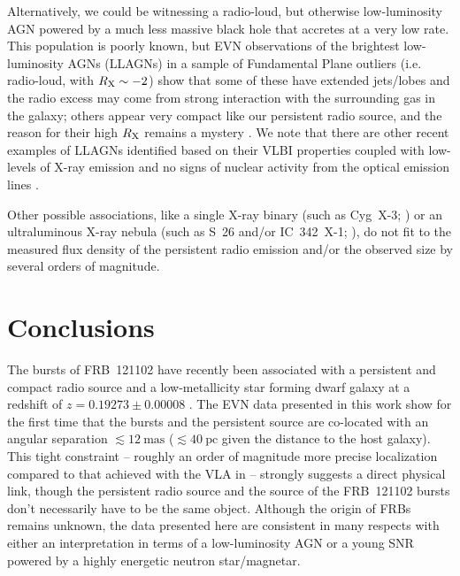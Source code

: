 \documentclass[twocolumn]{aastex61}
\newcommand{\frb}{FRB~121102\xspace}
\begin{document}
Alternatively, we could be witnessing a radio-loud, but otherwise low-luminosity AGN powered by a much less massive black hole that accretes at a very low rate. This population is poorly known, but EVN observations of the brightest low-luminosity AGNs (LLAGNs) in a sample of Fundamental Plane outliers (i.e. radio-loud, with $R_{\rm X} \sim -2$) show that some of these have extended jets/lobes and the radio excess may come from strong interaction with the surrounding gas in the galaxy; others appear very compact like our persistent radio source, and the reason for their high $R_{\rm X}$ remains a mystery \citep{paragi2012}.  We note that there are other recent examples of LLAGNs identified based on their VLBI properties coupled with low-levels of X-ray emission and no signs of nuclear activity from the optical emission lines \citep{park2016}.  

Other possible associations, like a single X-ray binary (such as Cyg~X-3; \citealt{merloni2003,reines2011}) or an ultraluminous X-ray nebula (such as S~26 and/or IC~342~X-1; \citealt{soria2010,cseh2012}), do not fit to the measured flux density of the persistent radio emission and/or the observed size by several orders of magnitude.

\section{Conclusions} \label{sec:conclusion}

The bursts of \frb have recently been associated with a persistent and compact radio source \citep{chatterjee2017} and a low-metallicity star forming dwarf galaxy at a redshift of $z = 0.19273 \pm 0.00008$ \citep{tendulkar2017}. The EVN data presented in this work show for the first time that the bursts and the persistent source are co-located with an angular separation $\lesssim 12~\mathrm{mas}$ ($\lesssim 40~\mathrm{pc}$ given the distance to the host galaxy). This tight constraint -- roughly an order of magnitude more precise localization compared to that achieved with the VLA in \citet{chatterjee2017} -- strongly suggests a direct physical link, though the persistent radio source and the source of the \frb bursts don't necessarily have to be the same object.  Although the origin of FRBs remains unknown, the data presented here are consistent in many respects with either an interpretation in terms of a low-luminosity AGN or a young SNR powered by a highly energetic neutron star/magnetar.

\acknowledgments
\end{document}
